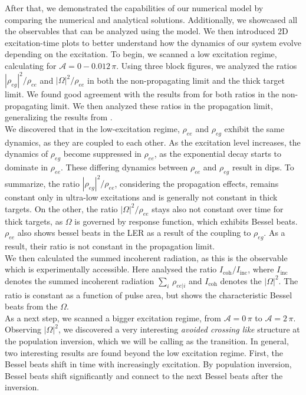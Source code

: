 After that, we demonstrated the capabilities of our numerical model by comparing the numerical and analytical solutions. Additionally, we showcased all the observables that can be analyzed using the model. We then introduced 2D excitation-time plots to better understand how the dynamics of our system evolve depending on the excitation. To begin, we scanned a low excitation regime, calculating for $\mathcal{A} = 0-0.012 \, \pi$. Using three block figures, we analyzed the ratios $|\rho_{eg}|^2/\rho_{ee}$ and $|\Omega|^2/\rho_{ee}$  in both the non-propagating limit and the thick target limit. We found good agreement with the results from \cite{wolff2023characterization} for both ratios in the non-propagating limit. We then analyzed these ratios in the propagation limit, generalizing the results from \cite{wolff2023characterization}.\\

We discovered that in the low-excitation regime, $\rho_{ee}$ and $\rho_{eg}$ exhibit the same dynamics, as they are coupled to each other. As the excitation level increases, the dynamics of $\rho_{eg}$ become suppressed in  $\rho_{ee}$, as the exponential decay starts to dominate in $\rho_{ee}$. These differing dynamics between $\rho_{ee}$ and $\rho_{eg}$ result in dips. To summarize, the ratio $|\rho_{eg}|^2/\rho_{ee}$, considering the propagation effects, remains constant only in ultra-low excitations and is generally not constant in thick targets. On the other, the ratio $|\Omega|^2/\rho_{ee}$ stays also not constant over time for thick targets, as $\Omega$ is governed by response function, which exhibits Bessel beats. $\rho_{ee}$ also shows bessel beats in the LER as a result of the coupling to $\rho_{eg}$. As a result, their ratio is not constant in the propagation limit. \\

We then calculated the summed incoherent radiation, as this is the observable which is experimentally accessible. Here analysed the ratio $I_\mathrm{coh}/ I_\mathrm{inc}$, where $I_\mathrm{inc}$ denotes the summed incoherent radiation $\sum_i\, \rho_{ee|i}$ and $I_\mathrm{coh}$ denotes the $|\Omega|^2$. The ratio is constant as a function of pulse area, but shows the characteristic Bessel beats from the $\Omega$. \\

As a next step, we scanned a bigger excitation regime, from $\mathcal{A} = 0\, \pi$ to $\mathcal{A} = 2\, \pi$. Observing $|\Omega|^2$, we discovered a very interesting \textit{avoided crossing like} structure at the population inversion, which we will be calling as the transition. In general, two interesting results are found beyond the low excitation regime. First, the Bessel beats shift in time with increasingly excitation. By population inversion, Bessel beats shift significantly and connect to the next Bessel beats after the inversion.\\


